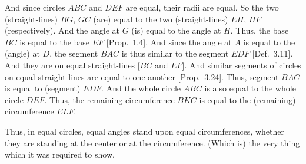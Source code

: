 \begin{Parallel}{}{}
{And since circles $ABC$ and $DEF$ are equal, their radii are equal.
So the two (straight-lines) $BG$, $GC$ (are) equal to the two (straight-lines)
$EH$, $HF$ (respectively). And the angle at $G$ (is) equal to the angle at $H$.
Thus, the base $BC$ is equal to the base $EF$ [Prop.~1.4].
And since the angle at $A$ is equal to the (angle) at $D$, the segment $BAC$ is
thus similar to the segment $EDF$ [Def.~3.11]. And they are on
equal straight-lines [$BC$ and $EF$]. And similar segments of circles on equal
straight-lines are equal to one another [Prop.~3.24]. Thus, segment
$BAC$ is equal to (segment) $EDF$. And the whole circle $ABC$ is also
equal to the whole circle $DEF$. Thus, the remaining circumference $BKC$
is equal to the (remaining) circumference $ELF$.

\epsfysize=1.5in
\centerline{}

Thus,   in equal circles, equal angles stand upon equal circumferences, whether they
are standing  at the center or at the circumference. (Which is)
the very thing which it was required to show.}
\end{Parallel}

